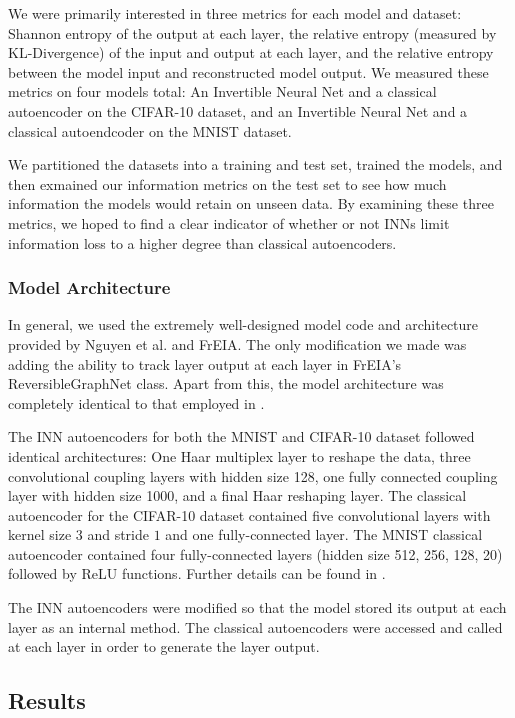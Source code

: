 \documentclass[11pt,letterpaper]{article}
\begin{document}
     We were primarily interested in three metrics for each model and dataset: Shannon entropy of the output at each layer, the relative entropy (measured by KL-Divergence) of the input and output at each layer, and the relative entropy between the model input and reconstructed model output. We measured these metrics on four models total: An Invertible Neural Net and a classical autoencoder on the CIFAR-10 dataset, and an Invertible Neural Net and a classical autoendcoder on the MNIST dataset.

     We partitioned the datasets into a training and test set, trained the models, and then exmained our information metrics on the test set to see how much information the models would retain on unseen data. By examining these three metrics, we hoped to find a clear indicator of whether or not INNs limit information loss to a higher degree than classical autoencoders.

   \subsubsection{Model Architecture}
     In general, we used the extremely well-designed model code and architecture provided by Nguyen et al. and FrEIA. The only modification we made was adding the ability to track layer output at each layer in FrEIA's ReversibleGraphNet class. Apart from this, the model architecture was completely identical to that employed in \cite{Nguyen2019}.

     The INN autoencoders for both the MNIST and CIFAR-10 dataset followed identical architectures: One Haar multiplex layer to reshape the data, three convolutional coupling layers with hidden size 128, one fully connected coupling layer with hidden size 1000, and a final Haar reshaping layer. The classical autoencoder for the CIFAR-10 dataset contained five convolutional layers with kernel size $3$ and stride $1$ and one fully-connected layer. The MNIST classical autoencoder contained four fully-connected layers (hidden size 512, 256, 128, 20) followed by ReLU functions. Further details can be found in \cite{Nguyen2019}.

     The INN autoencoders were modified so that the model stored its output at each layer as an internal method. The classical autoencoders were accessed and called at each layer in order to generate the layer output.

   \subsection{Results}
\end{document}
